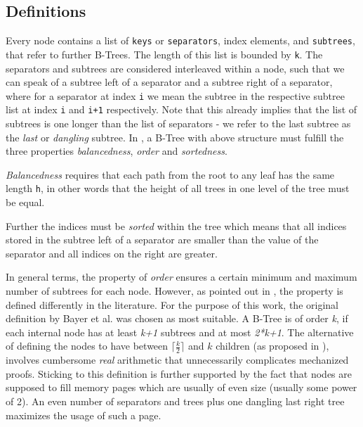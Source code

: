 \subsection{Definitions}
\label{sec:data_structure_defs}

Every node contains a list of \texttt{keys} or \texttt{separators}, index elements, and \texttt{subtrees},
that refer to further B-Trees.
The length of this list is bounded by \texttt{k}.
The separators and subtrees are considered interleaved within a node,
such that we can speak of a subtree left of a separator and a subtree right of a separator,
where for a separator at index \texttt{i} we mean the subtree in the respective
subtree list at index \texttt{i} and \texttt{i+1} respectively.
Note that this already implies that the list of subtrees is one
longer than the list of separators - we refer to the last subtree as the \textit{last} or
\textit{dangling} subtree.
In \parencite{DBLP:journals/acta/BayerM72},
a B-Tree with above structure must fulfill the three properties
\textit{balancedness}, \textit{order} and \textit{sortedness}.

\textit{Balancedness} requires that each path from the root to any leaf has the same length \texttt{h},
in other words that the height of all trees in one level of the tree must be equal.

Further the indices must be \textit{sorted} within the tree which means that all indices stored
in the subtree left of a separator are smaller than the value of the separator
and all indices on the right are greater.

In general terms, the property of \textit{order} ensures a certain minimum and maximum
number of subtrees for each node.
However, as pointed out in \parencite{DBLP:books/daglib/0095349_mod},
the property is defined differently in the literature.
For the purpose of this work, the original definition by Bayer et al. was chosen as most suitable.
A B-Tree is of order \textit{k}, if each internal node has at least \textit{k+1}
subtrees and at most \textit{2*k+1}.
The alternative of defining the nodes to have between $\lceil \frac{k}{2} \rceil$
and $k$ children (as proposed in \parencite{DBLP:books/lib/Knuth98a}),
involves cumbersome \textit{real} arithmetic that unnecessarily complicates
mechanized proofs.
Sticking to this definition is further supported by the fact that nodes are supposed
to fill memory pages which are usually of even size (usually some power of 2).
An even number of separators and trees plus one dangling last right tree maximizes
the usage of such a page.

